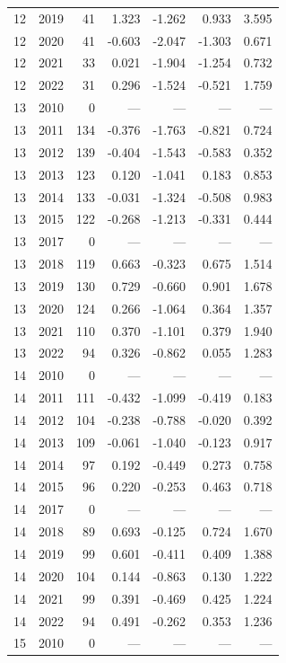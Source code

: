 \begin{longtable}{llrrrrr}
12 & 2019 & 41 & 1.323 & -1.262 & 0.933 & 3.595 \\
12 & 2020 & 41 & -0.603 & -2.047 & -1.303 & 0.671 \\
12 & 2021 & 33 & 0.021 & -1.904 & -1.254 & 0.732 \\
12 & 2022 & 31 & 0.296 & -1.524 & -0.521 & 1.759 \\
13 & 2010 & 0 & --- & --- & --- & --- \\
13 & 2011 & 134 & -0.376 & -1.763 & -0.821 & 0.724 \\
13 & 2012 & 139 & -0.404 & -1.543 & -0.583 & 0.352 \\
13 & 2013 & 123 & 0.120 & -1.041 & 0.183 & 0.853 \\
13 & 2014 & 133 & -0.031 & -1.324 & -0.508 & 0.983 \\
13 & 2015 & 122 & -0.268 & -1.213 & -0.331 & 0.444 \\
13 & 2017 & 0 & --- & --- & --- & --- \\
13 & 2018 & 119 & 0.663 & -0.323 & 0.675 & 1.514 \\
13 & 2019 & 130 & 0.729 & -0.660 & 0.901 & 1.678 \\
13 & 2020 & 124 & 0.266 & -1.064 & 0.364 & 1.357 \\
13 & 2021 & 110 & 0.370 & -1.101 & 0.379 & 1.940 \\
13 & 2022 & 94 & 0.326 & -0.862 & 0.055 & 1.283 \\
14 & 2010 & 0 & --- & --- & --- & --- \\
14 & 2011 & 111 & -0.432 & -1.099 & -0.419 & 0.183 \\
14 & 2012 & 104 & -0.238 & -0.788 & -0.020 & 0.392 \\
14 & 2013 & 109 & -0.061 & -1.040 & -0.123 & 0.917 \\
14 & 2014 & 97 & 0.192 & -0.449 & 0.273 & 0.758 \\
14 & 2015 & 96 & 0.220 & -0.253 & 0.463 & 0.718 \\
14 & 2017 & 0 & --- & --- & --- & --- \\
14 & 2018 & 89 & 0.693 & -0.125 & 0.724 & 1.670 \\
14 & 2019 & 99 & 0.601 & -0.411 & 0.409 & 1.388 \\
14 & 2020 & 104 & 0.144 & -0.863 & 0.130 & 1.222 \\
14 & 2021 & 99 & 0.391 & -0.469 & 0.425 & 1.224 \\
14 & 2022 & 94 & 0.491 & -0.262 & 0.353 & 1.236 \\
15 & 2010 & 0 & --- & --- & --- & --- \\

\end{longtable}
